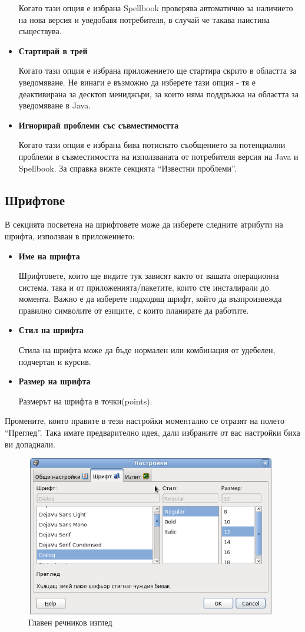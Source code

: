 \begin{itemize}
    Когато тази опция е избрана Spellbook проверява автоматично за
    наличието на нова версия и уведобавя потребителя, в случай че
    такава наистина съществува.
  \item \textbf{Стартирай в трей}
    
    Когато тази опция е избрана приложението ще стартира скрито в
    областта за уведомяване. Не винаги е възможно да изберете тази
    опция - тя е деактивирана за десктоп мениджъри, за които няма
    поддръжка на областта за уведомяване в Java.
  \item \textbf{Игнорирай проблеми със съвместимостта}

    Когато тази опция е избрана бива потиснато съобщението за
    потенциални проблеми в съвместимостта на използваната от
    потребителя версия на Java и Spellbook. За справка вижте секцията
    "`Известни проблеми"'.
\end{itemize}
\subsection{Шрифтове}
В секцията посветена на шрифтовете може да изберете следните атрибути
на шрифта, използван в приложението:

\begin{itemize}
  \item \textbf{Име на шрифта}

    Шрифтовете, които ще видите тук зависят както от вашата
    операционна система, така и от приложенията/пакетите, които сте
    инсталирали до момента. Важно е да изберете подходящ шрифт, който
    да възпроизвежда правилно символите от езиците, с които планирате
    да работите.
  \item \textbf{Стил на шрифта}

    Стила на шрифта може да бъде нормален или комбинация от удебелен,
    подчертан и курсив.
  \item \textbf{Размер на шрифта}

    Размерът на шрифта в точки(points). 
\end{itemize}

Промените, които правите в тези настройки моментално се отразят на
полето "`Преглед"'. Така имате предварително идея, дали избраните от
вас настройки биха ви допаднали.

\begin{figure}[htbp]
  \caption{Главен речников изглед}
  \centering
  \includegraphics[width=110mm, height=70mm]{images/font_preferences.png}
\end{figure}

